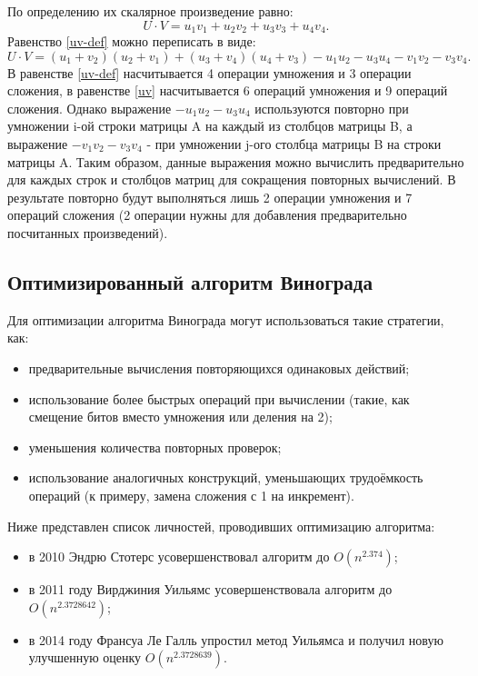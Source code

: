 \documentclass[12pt, a4paper]{report}
\begin{document}
	По определению их скалярное произведение равно:\\
	\begin{equation}
	\label{uv-def}
	U \cdot V = u_{1}v_{1} + u_{2}v_{2} + u_{3}v_{3} + u_{4}v_{4}.
	\end{equation}
	Равенство \ref{uv-def} можно переписать в виде:\\
	\begin{equation}
	\label{uv}
	U \cdot V = (u_{1} + v_{2})(u_{2} + v_{1}) + (u_{3} + v_{4})(u_{4} + v_{3}) - u_{1}u_{2} - u_{3}u_{4} - v_{1}v_{2} - v_{3}v_{4}.
	\end{equation}
	В равенстве \ref{uv-def} насчитывается 4 операции умножения и 3 операции сложения, в равенстве \ref{uv} насчитывается 6 операций умножения и 9 операций сложения. Однако выражение $- u_{1}u_{2} - u_{3}u_{4}$ используются повторно при умножении i-ой строки матрицы A на каждый из столбцов матрицы B, а выражение $- v_{1}v_{2} - v_{3}v_{4}$ - при умножении j-ого столбца матрицы B на строки матрицы A. Таким образом, данные выражения можно вычислить предварительно для каждых строк и столбцов матриц для сокращения повторных вычислений. В результате повторно будут выполняться лишь 2 операции умножения и 7 операций сложения (2 операции нужны для добавления предварительно посчитанных произведений).
	
	\subsection{Оптимизированный алгоритм Винограда}
	Для оптимизации алгоритма Винограда могут использоваться такие стратегии, как:
	\begin{itemize}
		\item предварительные вычисления повторяющихся одинаковых действий;
		\item использование более быстрых операций при вычислении (такие, как смещение битов вместо умножения или деления на 2);
		\item уменьшения количества повторных проверок;
		\item использование аналогичных конструкций, уменьшающих трудоёмкость операций (к примеру, замена сложения с 1 на инкремент).
	\end{itemize}
	Ниже представлен список личностей, проводивших оптимизацию алгоритма:
	\begin{itemize}
		\item в 2010 Эндрю Стотерс усовершенствовал алгоритм до $O(n^{2.374})$;
		\item в 2011 году Вирджиния Уильямс усовершенствовала алгоритм до $O(n^{2.3728642})$;
		\item в 2014 году Франсуа Ле Галль упростил метод Уильямса и получил новую улучшенную оценку $O(n^{2.3728639})$.
	\end{itemize}
	
\end{document}
